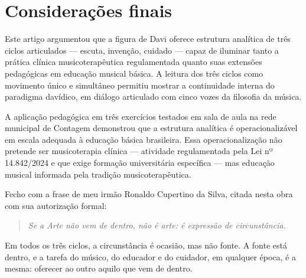 \documentclass[12pt,a4paper]{article}
\begin{document}
\section{Considerações finais}

Este artigo argumentou que a figura de Davi oferece estrutura analítica de três ciclos articulados --- escuta, invenção, cuidado --- capaz de iluminar tanto a prática clínica musicoterapêutica regulamentada quanto suas extensões pedagógicas em educação musical básica. A leitura dos três ciclos como movimento único e simultâneo permitiu mostrar a continuidade interna do paradigma davídico, em diálogo articulado com cinco vozes da filosofia da música.

A aplicação pedagógica em três exercícios testados em sala de aula na rede municipal de Contagem demonstrou que a estrutura analítica é operacionalizável em escala adequada à educação básica brasileira. Essa operacionalização não pretende ser musicoterapia clínica --- atividade regulamentada pela Lei nº 14.842/2024 e que exige formação universitária específica --- mas educação musical informada pela tradição musicoterapêutica.

Fecho com a frase de meu irmão Ronaldo Cupertino da Silva, citada nesta obra com sua autorização formal:

\begin{quote}
\itshape Se a Arte não vem de dentro, não é arte: é expressão de circunstância.
\end{quote}

Em todos os três ciclos, a circunstância é ocasião, mas não fonte. A fonte está dentro, e a tarefa do músico, do educador e do cuidador, em qualquer época, é a mesma: oferecer ao outro aquilo que vem de dentro.
\end{document}
